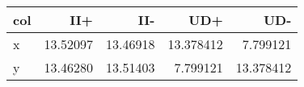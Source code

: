 
\begin{tabular}{l|r|r|r|r}
\hline
col & II+ & II- & UD+ & UD-\\
\hline
x & 13.52097 & 13.46918 & 13.378412 & 7.799121\\
\hline
y & 13.46280 & 13.51403 & 7.799121 & 13.378412\\
\hline
\end{tabular}
